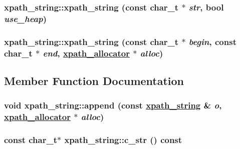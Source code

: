 \hypertarget{classxpath__string_e0661540ff7edecdf8a74f919b15f2eb}{
\subsubsection[xpath\_\-string]{\setlength{\rightskip}{0pt plus 5cm}xpath\_\-string::xpath\_\-string (const char\_\-t $\ast$ {\em str}, bool {\em use\_\-heap})}}
\label{classxpath__string_e0661540ff7edecdf8a74f919b15f2eb}


\hypertarget{classxpath__string_c46dc4ad206c24ade43acff34c241883}{
\subsubsection[xpath\_\-string]{\setlength{\rightskip}{0pt plus 5cm}xpath\_\-string::xpath\_\-string (const char\_\-t $\ast$ {\em begin}, const char\_\-t $\ast$ {\em end}, \hyperlink{classxpath__allocator}{xpath\_\-allocator} $\ast$ {\em alloc})}}
\label{classxpath__string_c46dc4ad206c24ade43acff34c241883}




\subsection{Member Function Documentation}
\hypertarget{classxpath__string_ab0d867c56d390213cf0fbe7334e1cc0}{
\subsubsection[append]{\setlength{\rightskip}{0pt plus 5cm}void xpath\_\-string::append (const \hyperlink{classxpath__string}{xpath\_\-string} \& {\em o}, \hyperlink{classxpath__allocator}{xpath\_\-allocator} $\ast$ {\em alloc})}}
\label{classxpath__string_ab0d867c56d390213cf0fbe7334e1cc0}


\hypertarget{classxpath__string_0c5d08cda063f380e065f87041d20b39}{
\subsubsection[c\_\-str]{\setlength{\rightskip}{0pt plus 5cm}const char\_\-t$\ast$ xpath\_\-string::c\_\-str () const}}
\label{classxpath__string_0c5d08cda063f380e065f87041d20b39}


